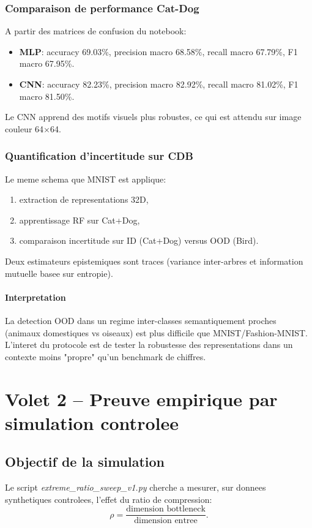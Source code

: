 \documentclass[11pt,a4paper]{article}
\begin{document}
\subsubsection{Comparaison de performance Cat-Dog}
A partir des matrices de confusion du notebook:
\begin{itemize}[leftmargin=1.2cm]
    \item \textbf{MLP}: accuracy 69.03\%, precision macro 68.58\%, recall macro 67.79\%, F1 macro 67.95\%.
    \item \textbf{CNN}: accuracy 82.23\%, precision macro 82.92\%, recall macro 81.02\%, F1 macro 81.50\%.
\end{itemize}

Le CNN apprend des motifs visuels plus robustes, ce qui est attendu sur image couleur 64\(\times\)64.

\subsubsection{Quantification d'incertitude sur CDB}
Le meme schema que MNIST est applique:
\begin{enumerate}[leftmargin=1.2cm]
    \item extraction de representations 32D,
    \item apprentissage RF sur Cat+Dog,
    \item comparaison incertitude sur ID (Cat+Dog) versus OOD (Bird).
\end{enumerate}
Deux estimateurs epistemiques sont traces (variance inter-arbres et information mutuelle basee sur entropie).

\paragraph{Interpretation}
La detection OOD dans un regime inter-classes semantiquement proches (animaux domestiques vs oiseaux) est plus difficile que MNIST/Fashion-MNIST. L'interet du protocole est de tester la robustesse des representations dans un contexte moins "propre" qu'un benchmark de chiffres.

\section{Volet 2 -- Preuve empirique par simulation controlee}
\subsection{Objectif de la simulation}
Le script \textit{extreme\_ratio\_sweep\_v1.py} cherche a mesurer, sur donnees synthetiques controlees, l'effet du ratio de compression:
\begin{equation}
\rho = \frac{\text{dimension bottleneck}}{\text{dimension entree}}.
\end{equation}
\end{document}
